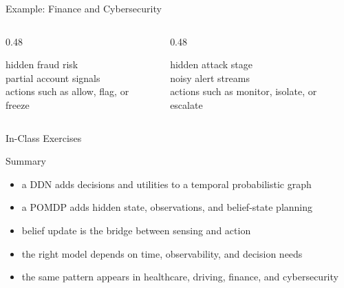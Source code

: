 \documentclass[aspectratio=169]{beamer}
\begin{document}
\begin{frame}{Example: Finance and Cybersecurity}
\begin{columns}[T,onlytextwidth]
  \begin{column}{0.48\textwidth}
    \begin{tcolorbox}[colback=plainbg,colframe=plainframe,boxrule=0.7pt,title=Finance]
    hidden fraud risk\\
    partial account signals\\
    actions such as allow, flag, or freeze
    \end{tcolorbox}
  \end{column}
  \begin{column}{0.48\textwidth}
    \begin{tcolorbox}[colback=questionbg,colframe=questionframe,boxrule=0.7pt,title=Cybersecurity]
    hidden attack stage\\
    noisy alert streams\\
    actions such as monitor, isolate, or escalate
    \end{tcolorbox}
  \end{column}
\end{columns}
\end{frame}

\begin{frame}{In-Class Exercises}
\end{frame}

\begin{frame}{Summary}
\begin{itemize}
  \item a DDN adds decisions and utilities to a temporal probabilistic graph
  \item a POMDP adds hidden state, observations, and belief-state planning
  \item belief update is the bridge between sensing and action
  \item the right model depends on time, observability, and decision needs
  \item the same pattern appears in healthcare, driving, finance, and cybersecurity
\end{itemize}
\end{frame}
\end{document}
